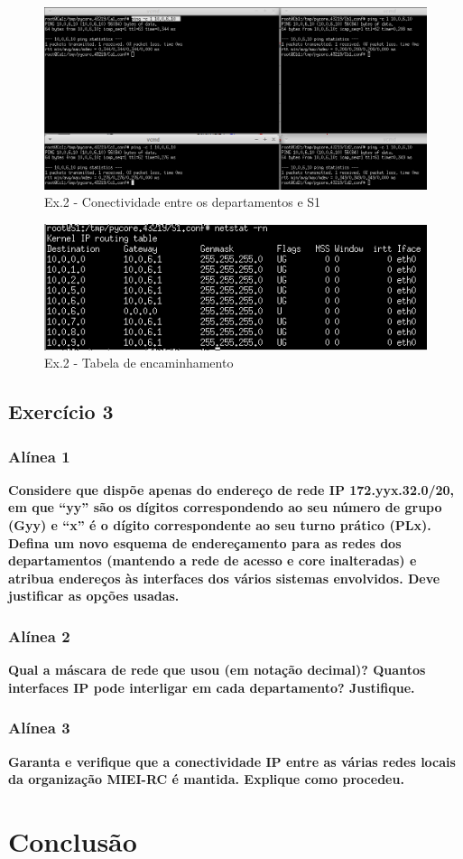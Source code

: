 \documentclass[a4paper]{report}
\begin{document}
\begin{figure}[H]
    \centering 
    \includegraphics[width=\textwidth]{images/conectividadeDep.png}
    \caption{Ex.2 - Conectividade entre os departamentos e S1}
    \label{fig:conectividadeDep}
\end{figure}

\begin{figure}[H]
    \centering 
    \includegraphics[width=\textwidth]{images/tabS1.png}
    \caption{Ex.2 - Tabela de encaminhamento}
    \label{fig:tabS1}
\end{figure}

\section{Exercício 3}

\subsection{Alínea 1}
\textbf{Considere que dispõe apenas do endereço de rede IP 172.yyx.32.0/20, em que “yy”
são os dígitos correspondendo ao seu número de grupo (Gyy) e “x” é o dígito 
correspondente ao seu turno prático (PLx). Defina um novo esquema de endereçamento para 
as redes dos departamentos (mantendo a rede de acesso e core inalteradas) e atribua 
endereços às interfaces dos vários sistemas envolvidos. Deve justificar as opções usadas.}

\subsection{Alínea 2}
\textbf{Qual a máscara de rede que usou (em notação decimal)? Quantos interfaces IP pode 
interligar em cada departamento? Justifique.}

\subsection{Alínea 3}
\textbf{Garanta e verifique que a conectividade IP entre as várias redes locais da 
organização MIEI-RC é mantida. Explique como procedeu.}

\chapter{Conclusão}
\end{document}
